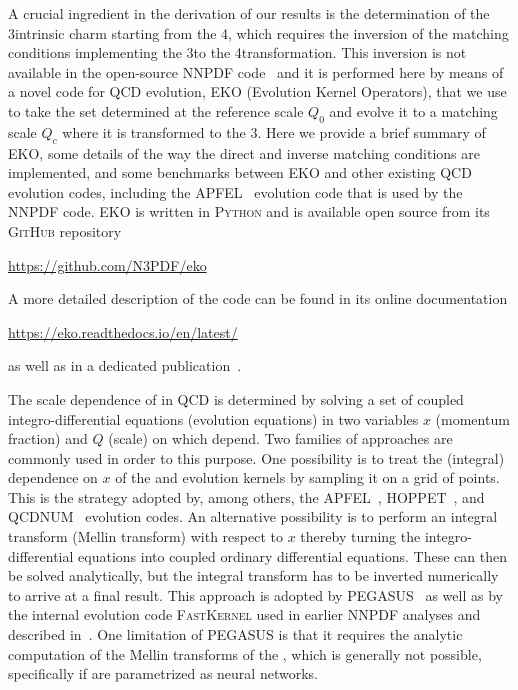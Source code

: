
A crucial ingredient in the derivation of our results
is the determination of the 3\fns intrinsic
charm \pdf starting from the 4\fns, which requires the inversion of the matching
conditions implementing the 3\fns to 
the 4\fns transformation.
%
This inversion is not available in the open-source NNPDF
code~\cite{NNPDF:2021uiq} and it is performed here by means of a novel code
for QCD evolution, 
 \textsc{\small EKO} (Evolution Kernel Operators), that we use to take the
 \pdf set determined at the reference scale $Q_0$ and evolve it to a
 matching scale $Q_c$ where it is transformed to the 3\fns.
%
Here we provide a brief summary of \textsc{\small
EKO}, some details of the way the direct and inverse matching
conditions are implemented, and some benchmarks between \textsc{\small
EKO} and other existing QCD evolution codes, including the  \textsc{\small
APFEL}~\cite{Bertone:2013vaa} evolution code that is used by the
NNPDF code.
\textsc{\small EKO} is written in \textsc{\small Python} and is available
open source from its \textsc{\small GitHub} repository
\begin{center}
\url{https://github.com/N3PDF/eko}
\end{center}
A more detailed description of the code can be found
in its online documentation
\begin{center}
\url{https://eko.readthedocs.io/en/latest/}
\end{center}
as well as in a dedicated publication~\cite{Candido:2022tld}.

The scale dependence of \pdfs in QCD is determined by solving a set
of coupled integro-differential equations (evolution equations) in two
variables $x$ (momentum fraction) and $Q$ (scale) on which \pdfs depend.
Two families of approaches are commonly used in order to this purpose.
%
One possibility is to treat the (integral) dependence on $x$ of the
\pdfs and evolution kernels by
sampling it on a grid of points.
%
This is the strategy adopted by, among others, the  \textsc{\small APFEL}~\cite{Bertone:2013vaa},
\textsc{\small HOPPET}~\cite{Salam:2008qg},
and \textsc{\small QCDNUM}~\cite{Botje:2010ay} evolution codes.
%
An alternative possibility is to perform an integral transform (Mellin
transform) with
respect to $x$ thereby turning the integro-differential equations into
coupled ordinary differential equations. These can then be solved
analytically, but the integral transform has to be inverted numerically
to arrive at a final result.
%
This approach is adopted by \textsc{\small PEGASUS}~\cite{pegasus} as well as by the
internal \pdf evolution code \textsc{\small FastKernel} used in earlier NNPDF analyses
and described in~\cite{DelDebbio:2007ee,Ball:2008by,Ball:2010de}.
%
One limitation of \textsc{\small PEGASUS} is that it requires the analytic
computation of the Mellin transforms of
the \pdfs, which is generally not possible, specifically if \pdfs are
parametrized as neural networks.
%

